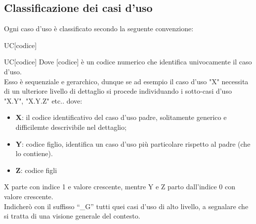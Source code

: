 \subsection{Classificazione dei casi d'uso}
Ogni caso d’uso è classificato secondo la seguente convenzione:
\begin{center}
	UC[codice]
\end{center}
UC[codice]
Dove [codice] è un codice numerico che identifica univocamente il caso d’uso.\\
Esso è sequenziale e gerarchico, dunque se ad esempio il caso d’uso "X" necessita di un ulteriore livello di dettaglio si procede individuando i sotto-casi d’uso "X.Y", "X.Y.Z" etc.. dove:\\
\begin{itemize}
	\item \textbf{X}: il codice identificativo del caso d'uso padre, solitamente generico e difficilemte descrivibile nel dettaglio; 
	\item \textbf{Y}: codice figlio, identifica un caso d'uso più particolare rispetto al padre (che lo contiene).
	\item \textbf{Z}: codice figli
	
\end{itemize}
X parte con indice 1 e valore crescente, mentre Y e Z parto dall'indice 0 con valore crescente.\\
Indicherò con il suffisso “\_G” tutti quei casi d’uso di alto livello, a segnalare che si tratta di una visione generale del contesto.